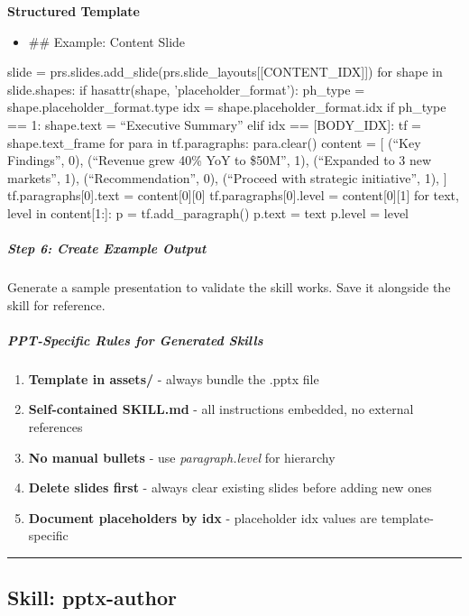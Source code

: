 \documentclass[11pt]{article}
\begin{document}
\textbf{Structured Template}
\begin{itemize}[leftmargin=*,itemsep=2pt,topsep=2pt]
\item {} \#\# Example: Content Slide
\end{itemize}
slide = prs.slides.add\_\allowbreak{}slide(prs.slide\_\allowbreak{}layouts[[CONTENT\_\allowbreak{}IDX]]) for shape in slide.shapes: if hasattr(shape, 'placeholder\_\allowbreak{}format'): ph\_\allowbreak{}type = shape.placeholder\_\allowbreak{}format.type idx = shape.placeholder\_\allowbreak{}format.idx if ph\_\allowbreak{}type == 1: shape.text = ``Executive Summary'' elif idx == [BODY\_\allowbreak{}IDX]: tf = shape.text\_\allowbreak{}frame for para in tf.paragraphs: para.clear() content = [ (``Key Findings'', 0), (``Revenue grew 40\% YoY to \$50M'', 1), (``Expanded to 3 new markets'', 1), (``Recommendation'', 0), (``Proceed with strategic initiative'', 1), ] tf.paragraphs[0].text = content[0][0] tf.paragraphs[0].level = content[0][1] for text, level in content[1:]: p = tf.add\_\allowbreak{}paragraph() p.text = text p.level = level


\subparagraph{Step 6: Create Example Output}\mbox{}\par

Generate a sample presentation to validate the skill works. Save it alongside the skill for reference.


\subparagraph{PPT-Specific Rules for Generated Skills}\mbox{}\par

\begin{enumerate}[leftmargin=*,itemsep=2pt,topsep=2pt]
\item {} \textbf{Template in assets/} - always bundle the .pptx file
\item {} \textbf{Self-contained SKILL.md} - all instructions embedded, no external references
\item {} \textbf{No manual bullets} - use \emph{paragraph.level} for hierarchy
\item {} \textbf{Delete slides first} - always clear existing slides before adding new ones
\item {} \textbf{Document placeholders by idx} - placeholder idx values are template-specific
\end{enumerate}

\vspace{0.8em}\hrule\vspace{0.8em}

\subsection{Skill: pptx-author}\label{file:skills-pptx-author-SKILL-md}
\end{document}
